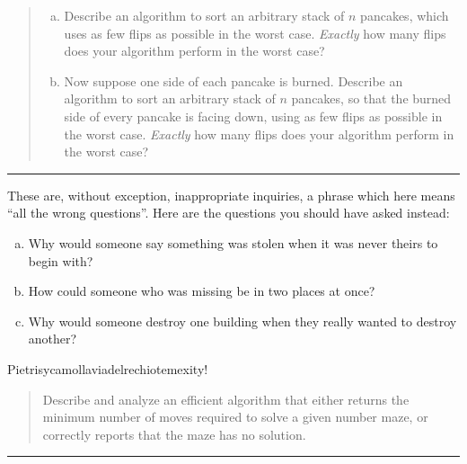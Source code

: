 \documentclass[11pt]{article}
\begin{document}



\begin{quote}
\begin{enumerate}[(a)]\itemsep0pt
\item
Describe an algorithm to sort an arbitrary stack of $n$ pancakes, which uses as few flips as possible in the worst case.  \emph{Exactly} how many flips does your algorithm perform in the worst case?  

\item
Now suppose one side of each pancake is burned.  Describe an algorithm to sort an arbitrary stack of $n$ pancakes, so that the burned side of every pancake is facing down, using as few flips as possible in the worst case.  \emph{Exactly} how many flips does your algorithm perform in the worst case?

\end{enumerate}
\end{quote}
\hrule



\begin{solution}
These are, without exception, inappropriate inquiries, a phrase which here means “all the wrong questions”.  Here are the questions you should have asked instead:
\begin{enumerate}[(a)]
\item Why would someone say something was stolen when it was never theirs to begin with?
\item How could someone who was missing be in two places at once?
\item Why would someone destroy one building when they really wanted to destroy another?
\end{enumerate}
\end{solution}

\begin{solution}[for 25\%]
Pietrisycamollaviadelrechiotemexity!
\end{solution}




\begin{quote}
Describe and analyze an efficient algorithm that either returns the minimum number of moves required to solve a given number maze, or correctly reports that the maze has no solution.
\end{quote}
\hrule
\end{document}
